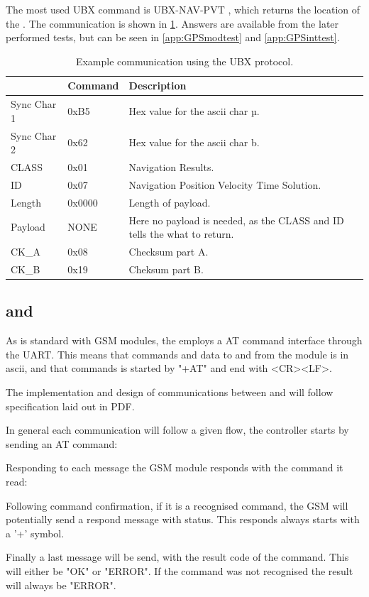 The most used UBX command is UBX-NAV-PVT \cite[p.~160]{NEO7_proto}, which returns the location of the \GPS.
The communication is shown in \cref{tab:UBXex}.
Answers are available from the later performed tests, but can be seen in \cref{app:GPSmodtest} and \cref{app:GPSinttest}.

\begin{table}
	\centering
	\begin{tabularx}{\textwidth}{l l X}
		\toprule
		& \textbf{Command} & \textbf{Description} \\
		\midrule
		Sync Char 1 & 0xB5 & Hex value for the ascii char µ. \\
		Sync Char 2 & 0x62 & Hex value for the ascii char b. \\
		CLASS & 0x01 & Navigation Results. \\
		ID & 0x07 &  Navigation Position Velocity Time Solution. \\
		Length & 0x0000 & Length of payload. \\
		Payload & NONE & Here no payload is needed, as the CLASS and ID tells the \GPS what to return. \\
		CK\_A & 0x08 & Checksum part A. \\
		CK\_B & 0x19 & Cheksum part B. \\
		\bottomrule
	\end{tabularx}
	\caption{Example communication using the UBX protocol.}
	\label{tab:UBXex}
\end{table}

\subsection{\SAMD and \SARA}
As is standard with GSM modules, the \SARA employs a AT command interface through the UART. This means that commands and data to and from the module is in ascii, and that commands is started by "+AT" and end with <CR><LF>. 

The implementation and design of communications between \SAMD and \SARA will follow specification laid out in PDF. 

In general each communication will follow a given flow, the controller starts by sending an AT command:


Responding to each message the GSM module responds with the command it read:


Following command confirmation, if it is a recognised command, the GSM will potentially send a respond message with status. This responds always starts with a '+' symbol. 


Finally a last message will be send, with the result code of the command. This will either be "OK" or "ERROR". If the command was not recognised the result will always be "ERROR".




\FloatBarrier